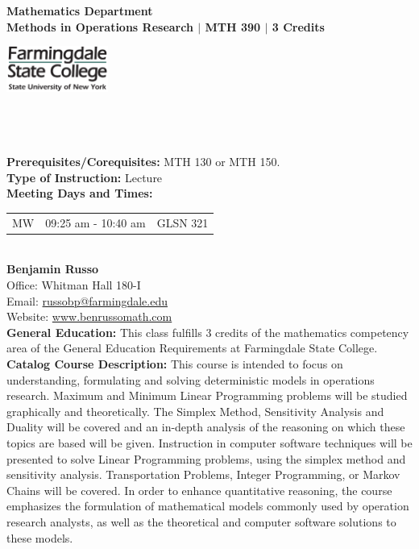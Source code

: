 \documentclass[11pt]{article}
\begin{document}
\begin{minipage}[]{.7\textwidth}
{\bf Mathematics Department}\\
{\bf  Methods in Operations Research $\mid$ MTH 390 $\mid$ 3 Credits}
\end{minipage}\begin{minipage}[]{.3\textwidth}\begin{flushright}\includegraphics[height=1.5cm]{farmingdalelogo.jpg}\end{flushright}\end{minipage}\\
\ \\ 
\ \\
{\bf Prerequisites/Corequisites:}  MTH 130 or MTH 150.\\

{\bf Type of Instruction: }Lecture\\

{\bf Meeting Days and Times: }\begin{tabular}[t]{rrr}
MW & 09:25 am - 10:40 am & GLSN 321\\
\end{tabular}\\

{\bf Benjamin Russo}\\
Office: Whitman Hall 180-I\\
Email:  \href{mailto:russobp@farmingdale.edu}{russobp@farmingdale.edu}\\
Website: \href{http://www.benrussomath.com}{www.benrussomath.com}\\

{\bf General Education:}
This class fulfills 3 credits of the mathematics competency area of the General Education Requirements at Farmingdale State College.\\

{\bf Catalog Course Description:}
This course is intended to focus on understanding, formulating and solving deterministic models in operations research. Maximum and Minimum Linear Programming problems will be studied graphically and theoretically. The Simplex Method, Sensitivity Analysis and Duality will be covered and an in-depth analysis of the reasoning on which these topics are based will be given. Instruction in computer software techniques will be presented to solve Linear Programming problems, using the simplex method and sensitivity analysis. Transportation Problems, Integer Programming, or Markov Chains will be covered. In order to enhance quantitative reasoning, the course emphasizes the formulation of mathematical models commonly used by operation research analysts, as well as the theoretical and computer software solutions to these models.\\
\end{document}
